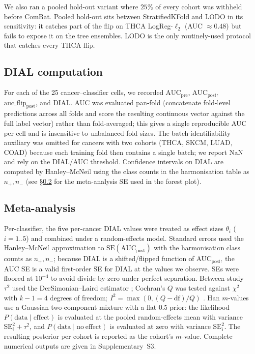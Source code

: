 \documentclass[11pt,a4paper]{article}
\begin{document}
We also ran a pooled hold-out variant where $25\%$ of every cohort
was withheld before ComBat. Pooled hold-out sits between
StratifiedKFold and LODO in its sensitivity: it catches part of the
flip on THCA LogReg-$\ell_2$ (AUC $\approx 0.48$) but fails to expose
it on the tree ensembles. LODO is the only routinely-used protocol
that catches every THCA flip.

\subsection{DIAL computation}
For each of the 25 cancer--classifier cells, we recorded
$\mathrm{AUC}_{\mathrm{pre}}$, $\mathrm{AUC}_{\mathrm{post}}$,
$\mathrm{auc\_flip}_{\mathrm{post}}$, and $\mathrm{DIAL}$. AUC was
evaluated pan-fold (concatenate fold-level predictions across all
folds and score the resulting continuous vector against the full
label vector) rather than fold-averaged; this gives a single
reproducible AUC per cell and is insensitive to unbalanced fold
sizes. The batch-identifiability auxiliary was omitted for cancers
with two cohorts (THCA, SKCM, LUAD, COAD) because each training fold
then contains a single batch; we report NaN and rely on the DIAL/AUC
threshold. Confidence intervals on DIAL are computed by
Hanley--McNeil \citep{hanley1982auc} using the class counts in the
harmonisation table as $n_+, n_-$ (see \S\ref{sec:meta} for the
meta-analysis SE used in the forest plot).

\subsection{Meta-analysis}
\label{sec:meta}
Per-classifier, the five per-cancer DIAL values were treated as
effect sizes $\theta_i$ ($i = 1..5$) and combined under a
random-effects model. Standard errors used the Hanley--McNeil
approximation \citep{hanley1982auc} to
$\mathrm{SE}(\mathrm{AUC}_{\mathrm{post}})$ with the harmonisation
class counts as $n_+, n_-$; because DIAL is a shifted/flipped
function of AUC$_{\mathrm{post}}$, the AUC SE is a valid first-order
SE for DIAL at the values we observe. SEs were floored at $10^{-4}$
to avoid divide-by-zero under perfect separation. Between-study
$\tau^2$ used the DerSimonian--Laird estimator
\citep{dersimonian1986meta}; Cochran's $Q$ was tested against
$\chi^2$ with $k-1 = 4$ degrees of freedom;
$I^2 = \max(0,(Q - \mathrm{df})/Q)$ \citep{higgins2002i2}. Han
$m$-values \citep{han2011metasoft,han2012mvalue,lee2017metasoft} use
a Gaussian two-component mixture with a flat $0.5$ prior: the
likelihood $P(\mathrm{data} \mid \mathrm{effect})$ is evaluated at
the pooled random-effects mean with variance
$\mathrm{SE}_i^2 + \tau^2$, and $P(\mathrm{data} \mid \mathrm{no\
effect})$ is evaluated at zero with variance $\mathrm{SE}_i^2$. The
resulting posterior per cohort is reported as the cohort's
$m$-value. Complete numerical outputs are given in Supplementary~S3.
\end{document}
